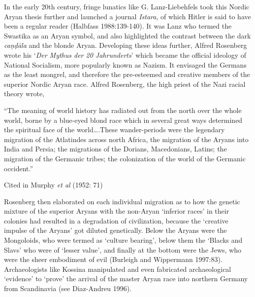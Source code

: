 In the early 20th century, fringe lunatics like G. Lanz-Liebehfels took this Nordic Aryan thesis further and launched a journal \textit{Istara}, of which Hitler is said to have been a regular reader (Halbfass 1988:139-140). It was Lanz who termed the Swastika as an Aryan symbol, and also highlighted the contrast between the dark \textit{caṇḍāla} and the blonde Aryan. Developing these ideas further, Alfred Rosenberg wrote his ‘\textit{Der Mythus der 20 Jahrunderts}’ which became the official ideology of National Socialism, more popularly known as Nazism. It envisaged the Germans as the least mongrel, and therefore the pre-esteemed and creative members of the superior Nordic Aryan race. Alfred Rosenberg, the high priest of the Nazi racial theory wrote,

\begin{myquote}
“The meaning of world history has radiated out from the north over the whole world, borne by a blue-eyed blond race which in several great ways determined the spiritual face of the world….These wander-periods were the legendary migration of the Atlatindes across north Africa, the migration of the Aryans into India and Persia; the migrations of the Dorians, Macedonians, Latins; the migration of the Germanic tribes; the colonization of the world of the Germanic occident.” 
\begin{myquote}
Cited in Murphy \textit{et al }(1952: 71)
\end{myquote}
\end{myquote}

Rosenberg then elaborated on each individual migration as to how the genetic mixture of the superior Aryans with the non-Aryan ‘inferior races’ in their colonies had resulted in a degradation of civilization, because the ‘creative impulse of the Aryans’ got diluted genetically. Below the Aryans were the Mongoloids, who were termed as ‘culture bearing’, below them the ‘Blacks and Slavs’ who were of ‘lesser value’, and finally at the bottom were the Jews, who were the sheer embodiment of evil (Burleigh and Wippermann 1997:83). Archaeologists like Kossina manipulated and even fabricated archaeological ‘evidence’ to ‘prove’ the arrival of the master Aryan race into northern Germany from Scandinavia (see Diaz-Andreu 1996).

